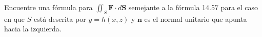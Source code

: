 \item Encuentre una fórmula para $\iint_S \mathbf{F} \cdot d\mathbf{S}$ semejante a la fórmula 14.57 para el caso en que $S$ está descrita por $y = h(x, z)$ y $\mathbf{n}$ es el normal unitario que apunta hacia la izquierda.
